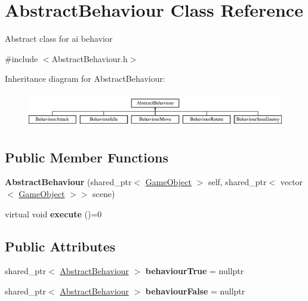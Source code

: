 \hypertarget{class_abstract_behaviour}{}\section{Abstract\+Behaviour Class Reference}
\label{class_abstract_behaviour}


Abstract class for ai behavior  




{\ttfamily \#include $<$Abstract\+Behaviour.\+h$>$}

Inheritance diagram for Abstract\+Behaviour\+:\begin{figure}[H]
\begin{center}
\leavevmode
\includegraphics[height=1.555556cm]{class_abstract_behaviour}
\end{center}
\end{figure}
\subsection*{Public Member Functions}
\begin{DoxyCompactItemize}
\item 
\mbox{\label{class_abstract_behaviour_a8a3a9217b3179f949a1d6a32f340c00c}} 
{\bfseries Abstract\+Behaviour} (shared\+\_\+ptr$<$ \mbox{\hyperlink{class_game_object}{Game\+Object}} $>$ self, shared\+\_\+ptr$<$ vector$<$ \mbox{\hyperlink{class_game_object}{Game\+Object}} $>$$>$ scene)
\item 
\mbox{\label{class_abstract_behaviour_ab99fb55a3b001e759e24d5b9721a742f}} 
virtual void {\bfseries execute} ()=0
\end{DoxyCompactItemize}
\subsection*{Public Attributes}
\begin{DoxyCompactItemize}
\item 
\mbox{\label{class_abstract_behaviour_a31b24fd948394c975ef56593e4ac0b28}} 
shared\+\_\+ptr$<$ \mbox{\hyperlink{class_abstract_behaviour}{Abstract\+Behaviour}} $>$ {\bfseries behaviour\+True} = nullptr
\item 
\mbox{\label{class_abstract_behaviour_ad8e09f7cb5f6341b16f20845c8d3dd59}} 
shared\+\_\+ptr$<$ \mbox{\hyperlink{class_abstract_behaviour}{Abstract\+Behaviour}} $>$ {\bfseries behaviour\+False} = nullptr
\end{DoxyCompactItemize}
